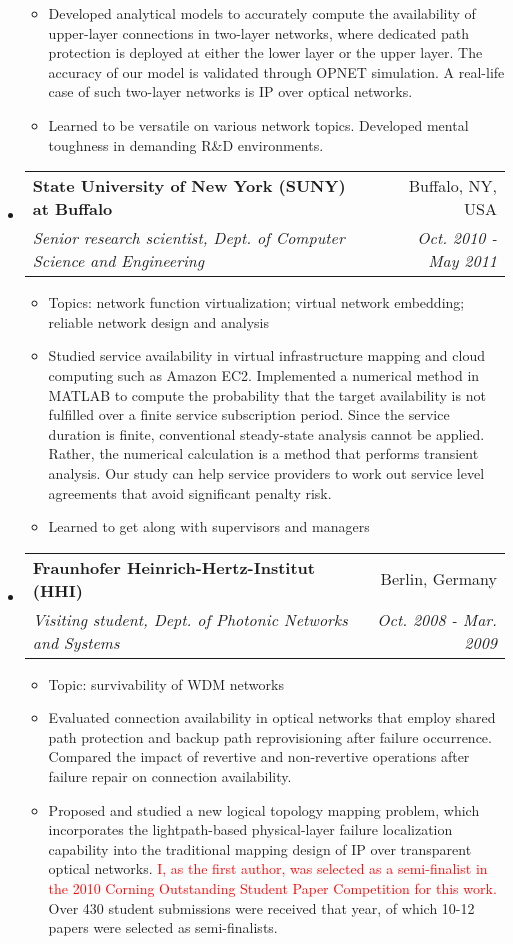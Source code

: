 \documentclass[letterpaper,11pt]{article}
\makeatletter
\newcommand{\ressubheading}[4]{
\begin{tabular*}{6.69in}{l@{\extracolsep{\fill}}r}
        \textbf{#1} & #2 \\
        \textit{#3} & \textit{#4} \\
\end{tabular*}\vspace{-6pt}
}
\newcommand{\resitem}[1]{\item #1 \vspace{-2pt}}
\makeatother
\begin{document}
\begin{itemize}
\begin{itemize}
        \resitem{Developed analytical models to accurately compute the availability of upper-layer connections in two-layer networks,
        where dedicated path protection is deployed at either the lower layer or the upper layer.
        The accuracy of our model is validated through OPNET simulation. A real-life case of such two-layer networks is IP over optical networks.}
        \resitem{Learned to be versatile on various network topics. Developed mental toughness in demanding R\&D environments.}
    \end{itemize}

\item
    \ressubheading{State University of New York (SUNY) at Buffalo}{Buffalo, NY, USA} %
    {Senior research scientist, Dept. of Computer Science and Engineering}{Oct. 2010 - May 2011} %
    \begin{itemize}
        \resitem{Topics: network function virtualization; virtual network embedding; reliable network design and analysis}
        \resitem{Studied service availability in virtual infrastructure mapping and cloud computing such as Amazon EC2.
        Implemented a numerical method in MATLAB to compute the probability that the target availability is not fulfilled over a finite service subscription period.
        Since the service duration is finite, conventional steady-state analysis cannot be applied.
        Rather, the numerical calculation is a method that performs transient analysis.
        Our study can help service providers to work out service level agreements that avoid significant penalty risk.}
        \resitem{Learned to get along with supervisors and managers}
    \end{itemize}

\item
    \ressubheading{Fraunhofer Heinrich-Hertz-Institut (HHI)}{Berlin, Germany}%
    {Visiting student, Dept. of Photonic Networks and Systems}{Oct. 2008 - Mar. 2009} %
    \begin{itemize}
        \resitem{Topic: survivability of WDM networks}
        \resitem{Evaluated connection availability in optical networks that employ shared path protection and backup path reprovisioning after failure occurrence.
        Compared the impact of revertive and non-revertive operations after failure repair on connection availability.}
        \resitem{Proposed and studied a new logical topology mapping problem, which incorporates the lightpath-based physical-layer failure localization capability
        into the traditional mapping design of IP over transparent optical networks.
        \textcolor{Red}{I, as the first author, was selected as a semi-finalist in the 2010 Corning Outstanding Student Paper Competition for this work.}
        Over 430 student submissions were received that year, of which 10-12 papers were selected as semi-finalists.}
    \end{itemize}


\end{itemize}
\end{document}
